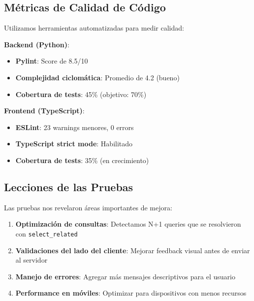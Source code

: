 \subsection{Métricas de Calidad de Código}

Utilizamos herramientas automatizadas para medir calidad:

\textbf{Backend (Python)}:
\begin{itemize}
    \item \textbf{Pylint}: Score de 8.5/10
    \item \textbf{Complejidad ciclomática}: Promedio de 4.2 (bueno)
    \item \textbf{Cobertura de tests}: 45\% (objetivo: 70\%)
\end{itemize}

\textbf{Frontend (TypeScript)}:
\begin{itemize}
    \item \textbf{ESLint}: 23 warnings menores, 0 errors
    \item \textbf{TypeScript strict mode}: Habilitado
    \item \textbf{Cobertura de tests}: 35\% (en crecimiento)
\end{itemize}

\subsection{Lecciones de las Pruebas}

Las pruebas nos revelaron áreas importantes de mejora:

\begin{enumerate}
    \item \textbf{Optimización de consultas}: Detectamos N+1 queries que se resolvieron con \texttt{select\_related}
    \item \textbf{Validaciones del lado del cliente}: Mejorar feedback visual antes de enviar al servidor
    \item \textbf{Manejo de errores}: Agregar más mensajes descriptivos para el usuario
    \item \textbf{Performance en móviles}: Optimizar para dispositivos con menos recursos
\end{enumerate}

